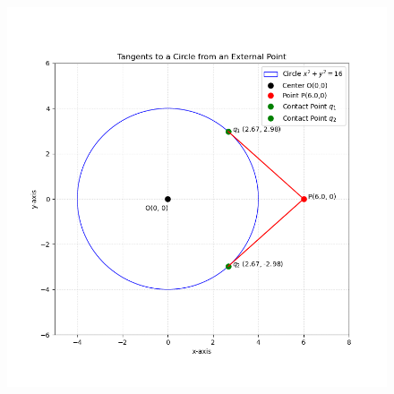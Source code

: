 \documentclass[article]{IEEEtran}
\begin{document}
\begin{figure}[H]
	\centering
	\includegraphics[width=1.1\linewidth]{figs/tangents_plot}
\end{figure}
	
	
\end{document}
